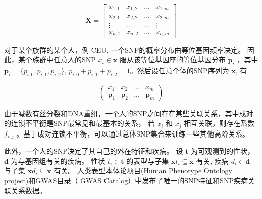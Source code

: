 \begin{equation}
\mathbf{X}=
\left[
\begin{matrix}
x_{1,1} & x_{1,2} & ...    & x_{1,m} \\
x_{2,1} & x_{2,2} & ...    & x_{2,m} \\
\vdots  & \ldots  & \ldots & \vdots  \\
x_{n,1} & x_{n,2} & ...    & x_{n,m}
\end{matrix}
\right]
\end{equation}

对于某个族群的某个人，例 CEU\cite{auton2015a}, 一个SNP的概率分布由等位基因频率决定。  因此，某个族群中任意人的SNP $x_i \in \mathbf{x}$ 服从该等位基因座的等位基因分布 $\mathbf{p}_i$ ，其中 $\mathbf{p}_i=\{p_{i,0},p_{i,1}, p_{i,2}\}$, $p_{i,0}+p_{i,1}+p_{i,2}=1$。然后设任意个体的SNP序列为 $\mathbf{x}$, 有

\begin{equation}
\left(
\begin{matrix}
x_1          & x_2 & ... & x_m \\
\mathbf{p}_1 & \mathbf{p}_2 & ... & \mathbf{p}_m
\end{matrix}
\right)
\end{equation}

由于减数有丝分裂和DNA重组，一个人的SNP之间存在某些关联关系，其中成对的连锁不平衡是SNP最常见和最基本的关系， 若 $x_i$ 和 $x_j$ 相互关联，则存在系数 $f_{i,j}$ 。基于成对连锁不平衡，可以通过总体SNP集合来训练一些其他高阶关系。

此外，一个人的SNP决定了其自己的外在特征和疾病。 设 $\mathbf{t}$ 为可观测到的性状， $\mathbf{d}$ 为与基因组有关的疾病。  性状 $t_i \in \mathbf{t}$ 的表型与子集 $\mathbf{x}t_i \subseteq \mathbf{x}$ 有关, 疾病 $d_i \in \mathbf{d}$ 与子集 $\mathbf{x}d_i \subseteq \mathbf{x}$ 有关。 人类表型本体论项目(Human Phenotype Ontology project)\cite{koehler2014human}和GWAS目录（ GWAS Catalog）\cite{macarthur2017the}中发布了唯一的SNP特征和SNP疾病关联关系数据。


